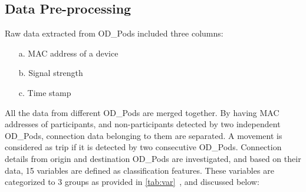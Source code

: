 \subsection{Data Pre-processing}
Raw data extracted from OD\_Pods included three columns:
\begin{enumerate}
\item[a.] MAC address of a device
\item[b.] Signal strength
\item[c.] Time stamp
\end{enumerate}
All the data from different OD\_Pods are merged together. By having MAC addresses of participants, and non-participants detected by two independent OD\_Pods, connection data belonging to them are separated. A movement is considered as trip if it is detected by two consecutive OD\_Pods. Connection details from origin and destination OD\_Pods are investigated, and based on their data, 15 variables are defined as classification features. These variables are categorized to 3 groups as provided in \cref{tab:var}~\cite{kalatian2018mobility}, and discussed below:
